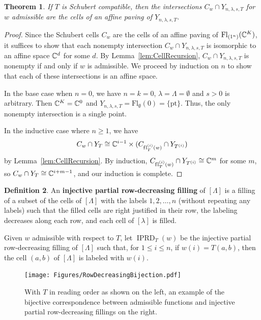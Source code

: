 \documentclass[11pt]{amsart}
\newtheorem{theorem}{Theorem}[section] %
\theoremstyle{definition}
\newtheorem{definition}[theorem]{Definition}
\newcommand{\Fl}{\mathrm{Fl}}
\newcommand{\la}{\lambda}
\newcommand{\fl}{\mathrm{f\hspace{0.25pt}l}}
\begin{document}
\begin{theorem}\label{thm:AffinePavingY}
If $T$ is Schubert compatible, then the intersections $C_w\cap Y_{n,\la,s,T}$ for $w$ admissible are the cells of an affine paving of $Y_{n,\la,s,T}$.
\end{theorem}

\begin{proof}
Since the Schubert cells $C_w$ are the cells of an affine paving of $\Fl_{(1^n)}(\bC^K)$, it suffices to show that each nonempty intersection $C_w\cap Y_{n,\la,s,T}$ is isomorphic to an affine space $\mathbb{C}^d$ for some $d$. By Lemma~\ref{lem:CellRecursion}, $C_w\cap Y_{n,\la,s,T}$ is nonempty if and only if $w$ is admissible. We proceed by induction on $n$ to show that each of these intersections is an affine space.



In the base case when $n=0$, we have $n = k = 0$, $\lambda = \Lambda = \emptyset$ and $s > 0$ is arbitrary. Then $\mathbb{C}^K = \mathbb{C}^0$ and $Y_{n, \lambda, s, T} = \Fl_\emptyset(0) = \{\mathrm{pt}\}$. Thus, the only nonempty intersection is a single point.

In the inductive case where $n\geq 1$, we have
\begin{equation}
    C_w\cap Y_{T}\cong \mathbb{C}^{i-1}\times (C_{\fl_T^{(i)}(w)}\cap Y_{T^{(i)}})
\end{equation}
by Lemma~\ref{lem:CellRecursion}.  By induction, 
$C_{\fl_T^{(i)}(w)}\cap Y_{T^{(i)}}\cong \mathbb{C}^m$ for some $m$, so $C_w\cap Y_T \cong \mathbb{C}^{i+m-1}$, and our induction is complete.
\end{proof}



\begin{definition}
An \textbf{injective partial row-decreasing filling} of $[\Lambda]$ is a filling of a subset of the cells of $[\Lambda]$ with the labels $1,2,\dots, n$ (without repeating any labels) such that the filled cells are right justified in their row, the labeling decreases along each row, and each cell of $[\lambda]$ is filled.

Given $w$ admissible with respect to $T$, let $\operatorname{IPRD}_T(w)$ be the injective partial row-decreasing filling of $[\Lambda]$ such that, for $1\leq i\leq n$, if $w(i) = T(a,b)$, then the cell $(a,b)$ of $[\Lambda]$ is labeled with $w(i)$.
\end{definition}

\begin{figure}[t]
  \centering
  \texttt{[image: Figures/RowDecreasingBijection.pdf]}
  \caption{With $T$ in reading order as shown on the left, an example of the bijective correspondence between admissible functions and injective partial row-decreasing fillings on the right.\label{fig:FillingBijectionExample}}
\end{figure}
\end{document}

